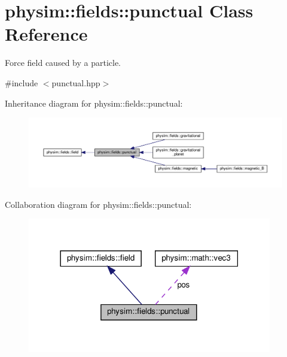 \hypertarget{classphysim_1_1fields_1_1punctual}{}\section{physim\+:\+:fields\+:\+:punctual Class Reference}
\label{classphysim_1_1fields_1_1punctual}


Force field caused by a particle.  




{\ttfamily \#include $<$punctual.\+hpp$>$}



Inheritance diagram for physim\+:\+:fields\+:\+:punctual\+:\nopagebreak
\begin{figure}[H]
\begin{center}
\leavevmode
\includegraphics[width=350pt]{classphysim_1_1fields_1_1punctual__inherit__graph}
\end{center}
\end{figure}


Collaboration diagram for physim\+:\+:fields\+:\+:punctual\+:\nopagebreak
\begin{figure}[H]
\begin{center}
\leavevmode
\includegraphics[width=302pt]{classphysim_1_1fields_1_1punctual__coll__graph}
\end{center}
\end{figure}
